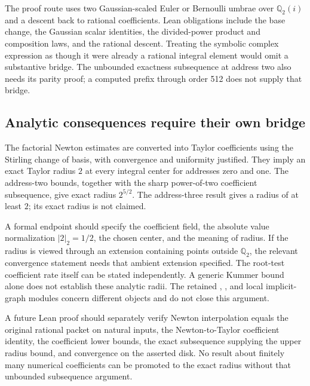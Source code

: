 The proof route uses two Gaussian-scaled Euler or Bernoulli umbrae over $\mathbb Q_2(i)$ and a descent back to rational coefficients. Lean obligations include the base change, the Gaussian scalar identities, the divided-power product and composition laws, and the rational descent. Treating the symbolic complex expression as though it were already a rational integral element would omit a substantive bridge. The unbounded exactness subsequence at address two also needs its parity proof; a computed prefix through order 512 does not supply that bridge.

\subsection{Analytic consequences require their own bridge}
The factorial Newton estimates are converted into Taylor coefficients using the Stirling change of basis, with convergence and uniformity justified. They imply an exact Taylor radius $2$ at every integral center for addresses zero and one. The address-two bounds, together with the sharp power-of-two coefficient subsequence, give exact radius $2^{5/2}$. The address-three result gives a radius of at least $2$; its exact radius is not claimed.

A formal endpoint should specify the coefficient field, the absolute value normalization $|2|_2=1/2$, the chosen center, and the meaning of radius. If the radius is viewed through an extension containing points outside $\mathbb Q_2$, the relevant convergence statement needs that ambient extension specified. The root-test coefficient rate itself can be stated independently. A generic Kummer bound alone does not establish these analytic radii. The retained , , and local implicit-graph modules concern different objects and do not close this argument.

A future Lean proof should separately verify Newton interpolation equals the original rational packet on natural inputs, the Newton-to-Taylor coefficient identity, the coefficient lower bounds, the exact subsequence supplying the upper radius bound, and convergence on the asserted disk. No result about finitely many numerical coefficients can be promoted to the exact radius without that unbounded subsequence argument.

